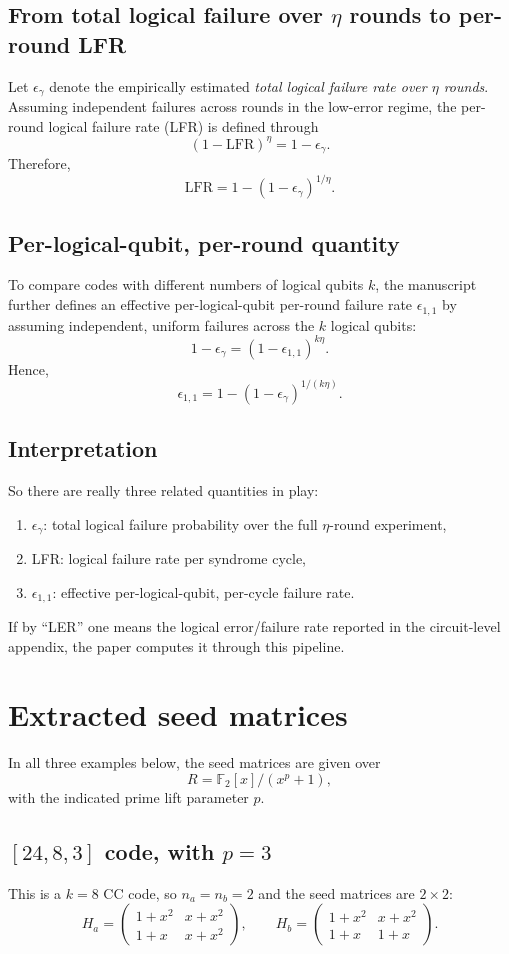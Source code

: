 \documentclass[11pt]{article}
\begin{document}
\subsection{From total logical failure over $\eta$ rounds to per-round LFR}
Let $\epsilon_\gamma$ denote the empirically estimated \emph{total logical failure rate over $\eta$ rounds}. Assuming independent failures across rounds in the low-error regime, the per-round logical failure rate (LFR) is defined through
\[
(1-\mathrm{LFR})^{\eta} = 1-\epsilon_\gamma.
\]
Therefore,
\[
\boxed{\mathrm{LFR} = 1-(1-\epsilon_\gamma)^{1/\eta}}.
\]

\subsection{Per-logical-qubit, per-round quantity}
To compare codes with different numbers of logical qubits $k$, the manuscript further defines an effective per-logical-qubit per-round failure rate $\epsilon_{1,1}$ by assuming independent, uniform failures across the $k$ logical qubits:
\[
1-\epsilon_\gamma = (1-\epsilon_{1,1})^{k\eta}.
\]
Hence,
\[
\boxed{\epsilon_{1,1} = 1-(1-\epsilon_\gamma)^{1/(k\eta)}}.
\]

\subsection{Interpretation}
So there are really three related quantities in play:
\begin{enumerate}[label=(\roman*)]
    \item $\epsilon_\gamma$: total logical failure probability over the full $\eta$-round experiment,
    \item LFR: logical failure rate per syndrome cycle,
    \item $\epsilon_{1,1}$: effective per-logical-qubit, per-cycle failure rate.
\end{enumerate}
If by ``LER'' one means the logical error/failure rate reported in the circuit-level appendix, the paper computes it through this pipeline.

\section{Extracted seed matrices}
In all three examples below, the seed matrices are given over
\[
R=\mathbb{F}_2[x]/(x^p+1),
\]
with the indicated prime lift parameter $p$.

\subsection{$[24,8,3]$ code, with $p=3$}
This is a $k=8$ CC code, so $n_a=n_b=2$ and the seed matrices are $2\times2$:
\[
H_a=
\begin{pmatrix}
1+x^2 & x+x^2 \\
1+x   & x+x^2
\end{pmatrix},
\qquad
H_b=
\begin{pmatrix}
1+x^2 & x+x^2 \\
1+x   & 1+x
\end{pmatrix}.
\]
\end{document}
